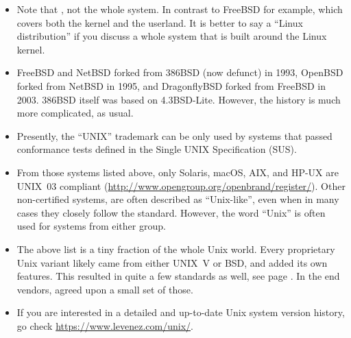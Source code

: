 \begin{itemize}
\item Note that , not the whole system.  In contrast to
FreeBSD for example, which covers both the kernel and the userland.  It is
better to say a ``Linux distribution'' if you discuss a whole system that is
built around the Linux kernel.
\item FreeBSD and NetBSD forked from 386BSD (now defunct) in 1993, OpenBSD
forked from NetBSD in 1995, and DragonflyBSD forked from FreeBSD in 2003.
386BSD itself was based on 4.3BSD-Lite.  However, the history is much more
complicated, as usual.
\item Presently, the ``UNIX'' trademark can be only used by systems that passed
conformance tests defined in the Single UNIX Specification (SUS).
\item From those systems listed above, only Solaris, macOS, AIX, and HP-UX are
UNIX~03 compliant (\url{http://www.opengroup.org/openbrand/register/}).  Other
non-certified systems, are often described as ``Unix-like'', even when in many
cases they closely follow the standard.  However, the word ``Unix'' is often used
for systems from either group.
\item The above list is a tiny fraction of the whole Unix world.  Every
proprietary Unix variant likely came from either UNIX~V or BSD, and added its
own features.  This resulted in quite a few standards as well, see page
\pageref{UNIXSTANDARDS}.  In the end vendors, agreed upon a small set of those.
\item If you are interested in a detailed and up-to-date Unix system version
history, go check \url{https://www.levenez.com/unix/}.
\end{itemize}



